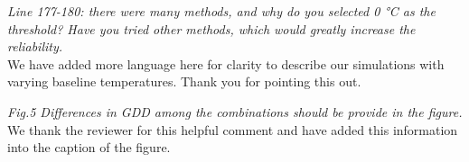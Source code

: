 \documentclass[11pt,a4paper]{article}\usepackage[]{graphicx}\usepackage[]{color}
\begin{document}
\textit{Line 177-180: there were many methods, and why do you selected 0 °C as the threshold? Have you tried other methods, which would greatly increase the reliability.}\\

We have added more language here for clarity to describe our simulations with varying baseline temperatures. Thank you for pointing this out. 

\textit{Fig.5 Differences in GDD among the combinations should be provide in the figure.}\\

We thank the reviewer for this helpful comment and have added this information into the caption of the figure. 




\newpage

\end{document}
